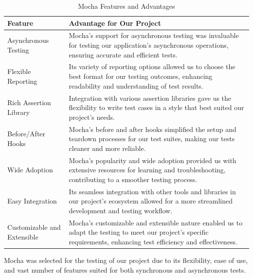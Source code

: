 \begin{table}[H]
    \centering
    \begin{tabularx}{\textwidth}{|l|X|}
        \hline
        \textbf{Feature}     & \textbf{Advantage for Our Project}                                                                                                                                  \\
        \hline
        Asynchronous Testing & Mocha's support for asynchronous testing was invaluable for testing our application's asynchronous operations, ensuring accurate and efficient tests.                   \\
        \hline
        Flexible Reporting   & Its variety of reporting options allowed us to choose the best format for our testing outcomes, enhancing readability and understanding of test results.               \\
        \hline
        Rich Assertion Library & Integration with various assertion libraries gave us the flexibility to write test cases in a style that best suited our project's needs.                          \\
        \hline
        Before/After Hooks  & Mocha's before and after hooks simplified the setup and teardown processes for our test suites, making our tests cleaner and more reliable.                           \\
        \hline
        Wide Adoption       & Mocha's popularity and wide adoption provided us with extensive resources for learning and troubleshooting, contributing to a smoother testing process.                 \\
        \hline
        Easy Integration    & Its seamless integration with other tools and libraries in our project's ecosystem allowed for a more streamlined development and testing workflow.                    \\
        \hline
        Customizable and Extensible & Mocha's customizable and extensible nature enabled us to adapt the testing to meet our project's specific requirements, enhancing test efficiency and effectiveness. \\
        \hline
    \end{tabularx}
    \caption{Mocha Features and Advantages}
    \label{tab:mochaTesting}
    
\end{table}

Mocha was selected for the testing of our project due to its flexibility, ease of use, and vast number of features suited for both synchronous and asynchronous tests. 

